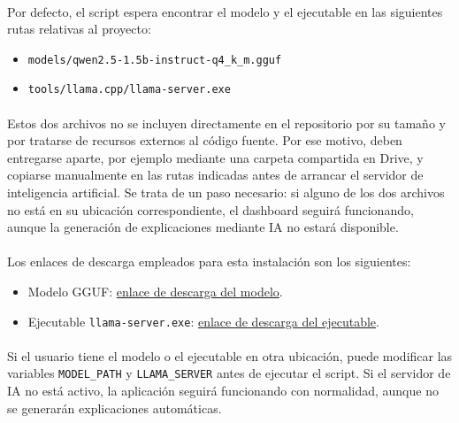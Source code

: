 \paragraph*{}Por defecto, el script espera encontrar el modelo y el ejecutable en las siguientes rutas relativas al proyecto:

\begin{itemize}
    \item \texttt{models/qwen2.5-1.5b-instruct-q4\_k\_m.gguf}
    \item \texttt{tools/llama.cpp/llama-server.exe}
\end{itemize}

\paragraph*{}Estos dos archivos no se incluyen directamente en el repositorio por su tamaño y por tratarse de recursos externos al código fuente. Por ese motivo, deben entregarse aparte, por ejemplo mediante una carpeta compartida en Drive, y copiarse manualmente en las rutas indicadas antes de arrancar el servidor de inteligencia artificial. Se trata de un paso necesario: si alguno de los dos archivos no está en su ubicación correspondiente, el dashboard seguirá funcionando, aunque la generación de explicaciones mediante IA no estará disponible.

\paragraph*{}Los enlaces de descarga empleados para esta instalación son los siguientes:

\begin{itemize}
    \item Modelo GGUF: \href{https://drive.google.com/file/d/1G9zDMnDXh1nBYblO3OPhTiROFFuCHuGS/view?usp=drive_link}{enlace de descarga del modelo}.
    \item Ejecutable \texttt{llama-server.exe}: \href{https://drive.google.com/file/d/1H3-fTrxCdiM9gZoL_5c38NETQeU0I__9/view?usp=drive_link}{enlace de descarga del ejecutable}.
\end{itemize}

\paragraph*{}Si el usuario tiene el modelo o el ejecutable en otra ubicación, puede modificar las variables \texttt{MODEL\_PATH} y \texttt{LLAMA\_SERVER} antes de ejecutar el script. Si el servidor de IA no está activo, la aplicación seguirá funcionando con normalidad, aunque no se generarán explicaciones automáticas.


